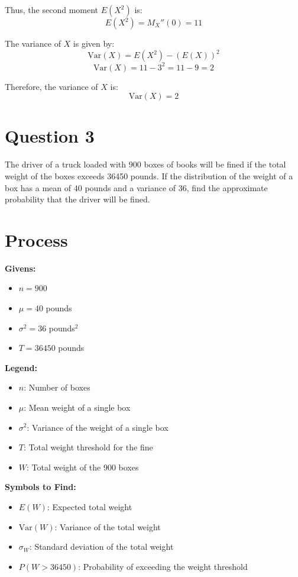 \documentclass[12pt]{article}
\begin{document}
Thus, the second moment \( E(X^2) \) is:
\[ E(X^2) = M_X''(0) = 11 \]

The variance of \( X \) is given by:
\[ \text{Var}(X) = E(X^2) - (E(X))^2 \]
\[ \text{Var}(X) = 11 - 3^2 = 11 - 9 = 2 \]

Therefore, the variance of \( X \) is:
\[ \text{Var}(X) = 2 \]


\newpage
\section*{Question 3}
The driver of a truck loaded with 900 boxes of books will be fined if the total weight of the boxes exceeds 36450 pounds. If the distribution of the weight of a box has a mean of 40 pounds and a variance of 36, find the approximate probability that the driver will be fined.

\section*{Process}
\begin{multicols}{2}
  \textbf{Givens:}
  \begin{itemize}
    \item \( n = 900 \)
    \item \( \mu = 40 \) pounds
    \item \( \sigma^2 = 36 \) pounds\(^2\)
    \item \( T = 36450 \) pounds
  \end{itemize}

  \columnbreak

  \textbf{Legend:}
  \begin{itemize}
    \item \( n \): Number of boxes
    \item \( \mu \): Mean weight of a single box
    \item \( \sigma^2 \): Variance of the weight of a single box
    \item \( T \): Total weight threshold for the fine
    \item \( W \): Total weight of the 900 boxes
  \end{itemize}

\end{multicols}

\textbf{Symbols to Find:}
\begin{itemize}
  \item \( E(W) \): Expected total weight
  \item \( \text{Var}(W) \): Variance of the total weight
  \item \( \sigma_W \): Standard deviation of the total weight
  \item \( P(W > 36450) \): Probability of exceeding the weight threshold
\end{itemize}
\end{document}
